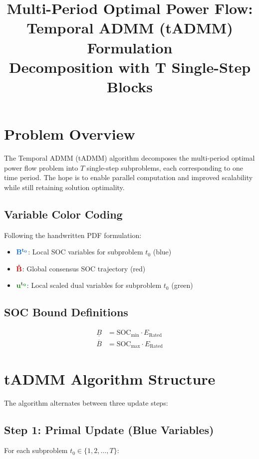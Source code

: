 \documentclass[11pt]{article}
\title{Multi-Period Optimal Power Flow:\\Temporal ADMM (tADMM) Formulation\\[0.5em] \large Decomposition with T Single-Step Blocks}
\author{}
\date{}
\newcommand{\blueB}[1]{\textcolor{bluevar}{\mathbf{#1}}}      %
\newcommand{\redBhat}[1]{\textcolor{redvar}{\mathbf{#1}}}     %
\newcommand{\greenu}[1]{\textcolor{greenvar}{\mathbf{#1}}}    %
\begin{document}
\maketitle

\section{Problem Overview}

The Temporal ADMM (tADMM) algorithm decomposes the multi-period optimal power flow problem into $T$ single-step subproblems, each corresponding to one time period. The hope is to enable parallel computation and improved scalability while still retaining solution optimality.

\subsection{Variable Color Coding}
Following the handwritten PDF formulation:
\begin{itemize}
    \item $\blueB{B^{t_0}}$: Local SOC variables for subproblem $t_0$ (blue)
    \item $\redBhat{\hat{B}}$: Global consensus SOC trajectory (red)
    \item $\greenu{u^{t_0}}$: Local scaled dual variables for subproblem $t_0$ (green)
\end{itemize}

\subsection{SOC Bound Definitions}
\begin{align}
\underline{B} &= \text{SOC}_{\min} \cdot E_{\text{Rated}} \\
\overline{B} &= \text{SOC}_{\max} \cdot E_{\text{Rated}}
\end{align}

\section{tADMM Algorithm Structure}

The algorithm alternates between three update steps:

\subsection{Step 1: Primal Update (Blue Variables)}
For each subproblem $t_0 \in \{1, 2, \ldots, T\}$:
\end{document}
